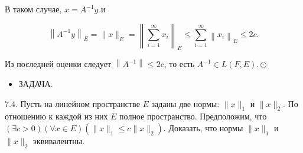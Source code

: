 В таком случае, $x=A^{-1} y$ и

$$
\left\|A^{-1} y\right\|_{E}=\|x\|_{E}=\left\|\sum_{i=1}^{\infty} x_{i}\right\|_{E} \leq \sum_{i=1}^{\infty}\left\|x_{i}\right\|_{E} \leq 2 c .
$$

Из последней оценки следует $\left\|A^{-1}\right\| \leq 2 c$, то есть $A^{-1} \in L(F, E) . \odot$

\begin{itemize}
  \item ЗАДАЧА.
\end{itemize}

7.4. Пусть на линейном пространстве $E$ заданы две нормы: $\|x\|_{1}$ и $\|x\|_{2}$. По отношению к каждой из них $E$ полное пространство. Предположим, что $(\exists c>0)(\forall x \in E)\left(\|x\|_{1} \leq c\|x\|_{2}\right)$. Доказать, что нормы $\|x\|_{1}$ и $\|x\|_{2}$ эквивалентны.
